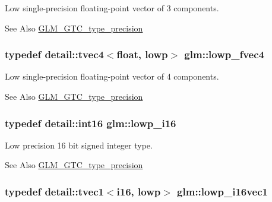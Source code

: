 Low single-\/precision floating-\/point vector of 3 components. \begin{DoxySeeAlso}{See Also}
\hyperlink{group__gtc__type__precision}{G\-L\-M\-\_\-\-G\-T\-C\-\_\-type\-\_\-precision} 
\end{DoxySeeAlso}
\hypertarget{group__gtc__type__precision_ga0d016cdbff067c450122115d0620bf85}{
\subsubsection[{lowp\-\_\-fvec4}]{\setlength{\rightskip}{0pt plus 5cm}typedef detail\-::tvec4$<$float, lowp$>$ {\bf glm\-::lowp\-\_\-fvec4}}}\label{group__gtc__type__precision_ga0d016cdbff067c450122115d0620bf85}
Low single-\/precision floating-\/point vector of 4 components. \begin{DoxySeeAlso}{See Also}
\hyperlink{group__gtc__type__precision}{G\-L\-M\-\_\-\-G\-T\-C\-\_\-type\-\_\-precision} 
\end{DoxySeeAlso}
\hypertarget{group__gtc__type__precision_gaf7bbfd31bcec25a416ea94d09efb5451}{
\subsubsection[{lowp\-\_\-i16}]{\setlength{\rightskip}{0pt plus 5cm}typedef detail\-::int16 {\bf glm\-::lowp\-\_\-i16}}}\label{group__gtc__type__precision_gaf7bbfd31bcec25a416ea94d09efb5451}
Low precision 16 bit signed integer type. \begin{DoxySeeAlso}{See Also}
\hyperlink{group__gtc__type__precision}{G\-L\-M\-\_\-\-G\-T\-C\-\_\-type\-\_\-precision} 
\end{DoxySeeAlso}
\hypertarget{group__gtc__type__precision_ga6f1e42c07424a2f14faf731c74ba2153}{
\subsubsection[{lowp\-\_\-i16vec1}]{\setlength{\rightskip}{0pt plus 5cm}typedef detail\-::tvec1$<$i16, lowp$>$ {\bf glm\-::lowp\-\_\-i16vec1}}}\label{group__gtc__type__precision_ga6f1e42c07424a2f14faf731c74ba2153}
